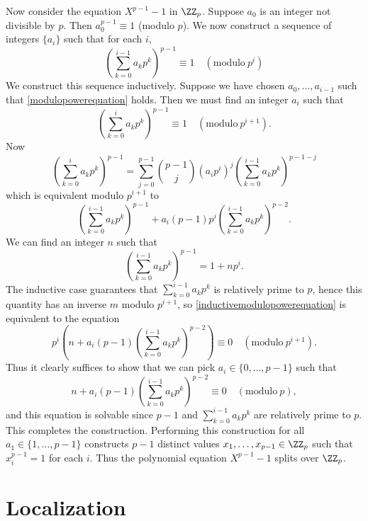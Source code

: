 \begin{example}
    Now consider the equation $X^{p-1} - 1$ in $\ZZ_p$. Suppose $a_0$ is an integer not divisible by $p$. Then $a_0^{p-1} \equiv 1$ (modulo $p$). We now construct a sequence of integers $\{ a_i \}$ such that for each $i$,
    \begin{equation} \label{modulopowerequation}
        \left( \sum_{k = 0}^{i-1} a_k p^k \right)^{p-1} \equiv 1 \quad(\text{modulo}\ p^i)
    \end{equation}
    We construct this sequence inductively. Suppose we have chosen $a_0,\dots, a_{i-1}$ such that \eqref{modulopowerequation} holds. Then we must find an integer $a_i$ such that
    \begin{equation} \label{inductivemodulopowerequation}
        \left( \sum_{k = 0}^i a_k p^k \right)^{p-1} \equiv 1 \quad(\text{modulo}\ p^{i+1}).
    \end{equation}
    Now
    \[ \left( \sum_{k = 0}^i a_k p^k \right)^{p-1} = \sum_{j = 0}^{p-1} \binom{p-1}{j} \left( a_ip^i \right)^j \left( \sum_{k = 0}^{i-1} a_k p^k \right)^{p-1-j} \]
    which is equivalent modulo $p^{i+1}$ to
    \[ \left( \sum_{k = 0}^{i-1} a_k p^k \right)^{p-1} + a_i (p-1)p^i \left( \sum_{k = 0}^{i-1} a_k p^k \right)^{p-2}. \]
    We can find an integer $n$ such that
    \[ \left( \sum_{k = 0}^{i-1} a_k p^k \right)^{p-1} = 1 + np^i. \]
    The inductive case guarantees that $\sum_{k = 0}^{i-1} a_k p^k$ is relatively prime to $p$, hence this quantity has an inverse $m$ modulo $p^{i+1}$, so \eqref{inductivemodulopowerequation} is equivalent to the equation
    \[ p^i \left(n + a_i (p-1) \left( \sum_{k = 0}^{i-1} a_k p^k \right)^{p-2} \right) \equiv 0 \quad(\text{modulo}\ p^{i+1}). \]
    Thus it clearly suffices to show that we can pick $a_i \in \{ 0, \dots, p-1 \}$ such that
    \[ n + a_i (p-1) \left( \sum_{k = 0}^{i-1} a_k p^k \right)^{p-2} \equiv 0 \quad(\text{modulo}\ p), \]
    and this equation is solvable since $p-1$ and $\sum_{k = 0}^{i-1} a_k p^k$ are relatively prime to $p$. This completes the construction. Performing this construction for all $a_1 \in \{ 1, \dots, p-1 \}$ constructs $p-1$ distinct values $x_1, \dots, x_{p-1} \in \ZZ_p$ such that $x_i^{p-1} = 1$ for each $i$. Thus the polynomial equation $X^{p-1} - 1$ splits over $\ZZ_p$.
\end{example}

\section{Localization}

